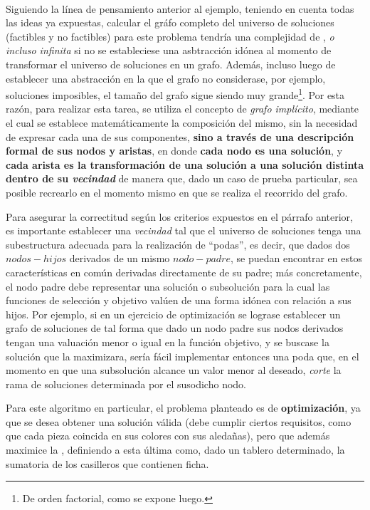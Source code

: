 \documentclass[11pt, a4paper, twoside]{article}
\begin{document}
\begin{paragraph}\


Siguiendo la línea de pensamiento anterior al ejemplo, teniendo en cuenta todas
las ideas ya expuestas, calcular el gráfo completo del universo de soluciones
(factibles y no factibles) para este problema tendría una complejidad de
, \emph{o incluso infinita} si no se estableciese una asbtracción
idónea al momento de transformar el universo de soluciones en un grafo. Además,
incluso luego de establecer una abstracción en la que el grafo no considerase,
por ejemplo, soluciones imposibles, el tamaño del grafo sigue siendo muy grande\footnote{
De orden factorial, como se expone luego.}. Por esta razón, para realizar esta tarea, se utiliza el
concepto de \emph{grafo implícito}, mediante el cual se establece matemáticamente la
composición del mismo, sin la necesidad de expresar cada una de sus componentes,
\textbf{sino a través de una descripción formal de sus nodos y aristas}, en
donde \textbf{cada nodo es una solución}, y \textbf{cada arista es la
transformación de una solución a una solución distinta dentro de su
\emph{vecindad}} de manera que, dado un caso de prueba particular, sea posible
recrearlo en el momento mismo en que se realiza el recorrido del grafo.

Para asegurar la correctitud según los criterios expuestos en el párrafo
anterior, es importante establecer una \emph{vecindad} tal que el universo de
soluciones tenga una subestructura adecuada para la realización de ``podas'', es
decir, que dados dos $nodos-hijos$ derivados de un mismo $nodo-padre$, se puedan
encontrar en estos características en común derivadas directamente de su padre;
más concretamente, el nodo padre debe representar una solución o subsolución
para la cual las funciones de selección y objetivo valúen de una forma idónea
con relación a sus hijos. Por ejemplo, si en un ejercicio de optimización se
lograse establecer un grafo de soluciones de tal forma que dado un nodo padre
sus nodos derivados tengan una valuación menor o igual en la función objetivo, y
se buscase la solución que la maximizara, sería fácil implementar entonces una
poda que, en el momento en que una subsolución alcance un valor menor al
deseado, \emph{corte} la rama de soluciones determinada por el susodicho nodo.

Para este algoritmo en particular, el problema planteado es de
\textbf{optimización}, ya que se desea obtener una solución válida (debe cumplir
ciertos requisitos, como que cada pieza coincida en sus colores con sus
aledañas), pero que además maximice la ,
definiendo a esta última como, dado un tablero determinado, la sumatoria de los
casilleros que contienen ficha.


\end{paragraph}
\end{document}

